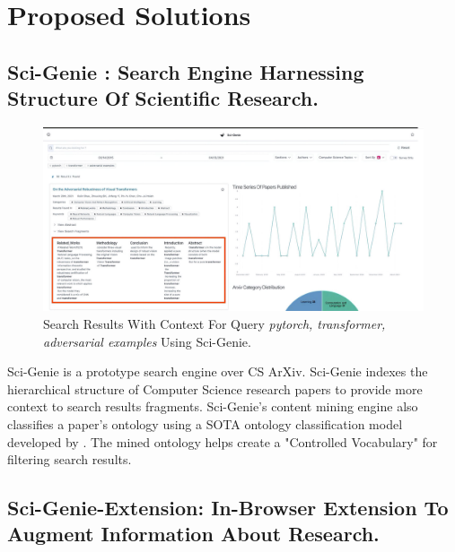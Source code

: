 \chapter{Proposed Solutions}
\label{method}

\section{Sci-Genie : Search Engine Harnessing Structure Of Scientific Research. }
\begin{figure}[h]
    \centering
    \includegraphics[width=\maxwidth{\textwidth}]{src/images/sci-genie-context-exp.jpeg}
    \caption{Search Results With Context For Query \textit{pytorch, transformer, adversarial examples} Using Sci-Genie. }
    \label{figure\arabic{figurecounter}}
\end{figure}

Sci-Genie is a prototype search engine over CS ArXiv. Sci-Genie indexes the hierarchical structure of Computer Science research papers to provide more context to search results fragments. Sci-Genie's content mining engine also classifies a paper's ontology using a SOTA ontology classification model developed by \cite{salatino2020ontology}. The mined ontology helps create a "Controlled Vocabulary" for filtering search results. 

\section{Sci-Genie-Extension: In-Browser Extension To Augment Information About Research. }

